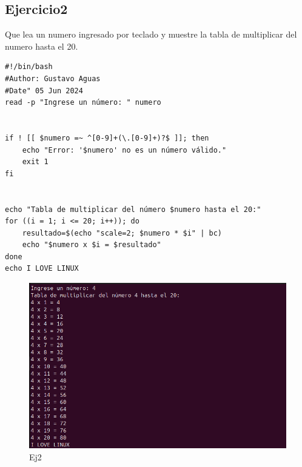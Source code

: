\documentclass[11pt,twoside]{book}
\begin{document}
\subsection{Ejercicio2}
Que lea un numero ingresado por teclado y muestre la tabla de multiplicar del numero hasta el 20.
\begin{lstlisting}
#!/bin/bash
#Author: Gustavo Aguas
#Date" 05 Jun 2024
read -p "Ingrese un número: " numero


if ! [[ $numero =~ ^[0-9]+(\.[0-9]+)?$ ]]; then
    echo "Error: '$numero' no es un número válido."
    exit 1
fi


echo "Tabla de multiplicar del número $numero hasta el 20:"
for ((i = 1; i <= 20; i++)); do
    resultado=$(echo "scale=2; $numero * $i" | bc)
    echo "$numero x $i = $resultado"
done
echo I LOVE LINUX

\end{lstlisting}
\begin{figure}
    \centering
    \includegraphics[width=1\linewidth]{ej2bc.png}
    \caption{Ej2}
\end{figure}
\end{document}
